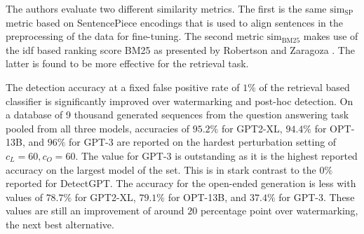     The authors evaluate two different similarity metrics.
    The first is the same $\mathrm{sim}_{\mathrm{SP}}$ metric based on SentencePiece encodings that is used to align sentences in the preprocessing of the data for fine-tuning.
    The second metric $\mathrm{sim}_{\mathrm{BM}25}$ makes use of the idf based ranking score BM25 as presented by Robertson and Zaragoza \cite{robertson2009probabilistic}.
    The latter is found to be more effective for the retrieval task.

    The detection accuracy at a fixed false positive rate of $1\%$ of the retrieval based classifier is significantly improved over watermarking and post-hoc detection.
    On a database of 9 thousand generated sequences from the question answering task pooled from all three models, accuracies of $95.2\%$ for GPT2-XL, $94.4\%$ for OPT-13B, and $96\%$ for GPT-3 are reported on the hardest perturbation setting of $c_L=60,c_O=60$.
    The value for GPT-3 is outstanding as it is the highest reported accuracy on the largest model of the set.
    This is in stark contrast to the $0\%$ reported for DetectGPT.
    The accuracy for the open-ended generation is less with values of $78.7\%$ for GPT2-XL, $79.1\%$ for OPT-13B, and $37.4\%$ for GPT-3.
    These values are still an improvement of around $20$ percentage point over watermarking, the next best alternative.


